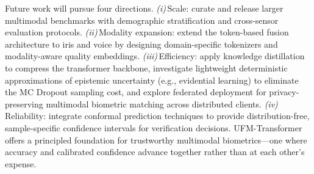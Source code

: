 \documentclass[10pt,journal,compsoc]{IEEEtran}
\begin{document}
Future work will pursue four directions. \textit{(i)}\,Scale: curate and release larger multimodal benchmarks with demographic stratification and cross-sensor evaluation protocols. \textit{(ii)}\,Modality expansion: extend the token-based fusion architecture to iris and voice by designing domain-specific tokenizers and modality-aware quality embeddings. \textit{(iii)}\,Efficiency: apply knowledge distillation to compress the transformer backbone, investigate lightweight deterministic approximations of epistemic uncertainty (e.g., evidential learning) to eliminate the MC Dropout sampling cost, and explore federated deployment for privacy-preserving multimodal biometric matching across distributed clients. \textit{(iv)}\,Reliability: integrate conformal prediction techniques to provide distribution-free, sample-specific confidence intervals for verification decisions. UFM-Transformer offers a principled foundation for trustworthy multimodal biometrics---one where accuracy and calibrated confidence advance together rather than at each other's expense.



\end{document}
